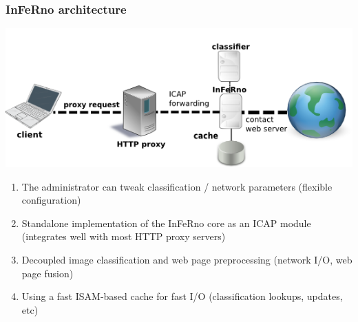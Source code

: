 \documentclass{beamer}
\begin{document}
\begin{frame}
\frametitle{InFeRno architecture}
\begin{center}
	\includegraphics[scale=0.6]{images/network_diagram.png}
	\begin{enumerate}
		\item The administrator can tweak classification / network parameters (flexible configuration)
		\item Standalone implementation of the InFeRno core as an ICAP module (integrates well with most HTTP proxy servers)
		\item Decoupled image classification and web page preprocessing (network I/O, web page fusion)
		\item Using a fast ISAM-based cache for fast  I/O (classification lookups, updates, etc)
	\end{enumerate}
\end{center}
\end{frame}
\end{document}
